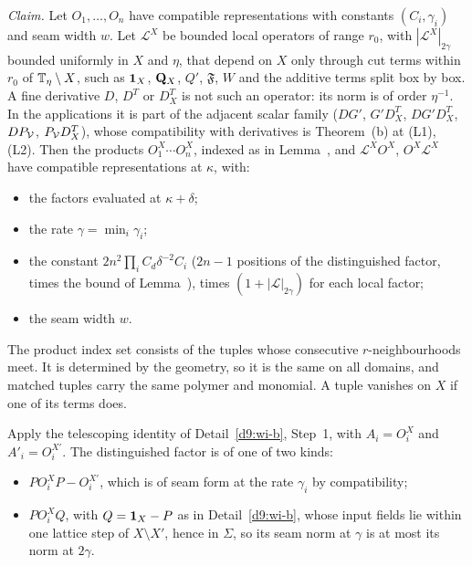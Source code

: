 \begin{detail}\label{d9:prod-compat}
\emph{Claim.} Let $O_1,\dots,O_n$ have compatible representations with constants $(C_i,\gamma_i)$ and seam width $w$. Let $\mathcal L^X$ be bounded local operators of range $r_0$, with $|\mathcal L^X|_{2\gamma}$ bounded uniformly in $X$ and $\eta$, that depend on $X$ only through cut terms within $r_0$ of $\mathbb T_\eta\setminus X$, such as $\mathbf 1_X$, $\mathbf Q_X$, $Q'$, $\mathfrak F$, $W$ and the additive terms split box by box. A fine derivative $D$, $D^T$ or $D^T_X$ is not such an operator: its norm is of order $\eta^{-1}$. In the applications it is part of the adjacent scalar family ($DG'$, $G'D^T_X$, $DG'D^T_X$, $DP_\mathcal V$, $P_\mathcal V D^T_X$), whose compatibility with derivatives is Theorem~(b) at (L1), (L2). Then the products $O_1^X\cdots O_n^X$, indexed as in Lemma~, and $\mathcal L^XO^X$, $O^X\mathcal L^X$ have compatible representations at $\kappa$, with:
\begin{itemize}
\item the factors evaluated at $\kappa+\delta$;
\item the rate $\gamma=\min_i\gamma_i$;
\item the constant $2n^2\prod_iC_d\delta^{-2}C_i$ ($2n-1$ positions of the distinguished factor, times the bound of Lemma~), times $(1+|\mathcal L|_{2\gamma})$ for each local factor;
\item the seam width $w$.
\end{itemize}
\begin{step}
The product index set consists of the tuples whose consecutive $r$-neighbourhoods meet. It is determined by the geometry, so it is the same on all domains, and matched tuples carry the same polymer and monomial. A tuple vanishes on $X$ if one of its terms does.
\end{step}
\begin{step}[Differences]
Apply the telescoping identity of Detail~\ref{d9:wi-b}, Step~1, with $A_i=O_i^X$ and $A'_i=O_i^{X'}$. The distinguished factor is of one of two kinds:
\begin{itemize}
\item $PO^X_iP-O^{X'}_i$, which is of seam form at the rate $\gamma_i$ by compatibility;
\item $PO_i^XQ$, with $Q=\mathbf 1_X-P$ as in Detail~\ref{d9:wi-b}, whose input fields lie within one lattice step of $X\setminus X'$, hence in $\Sigma$, so its seam norm at $\gamma$ is at most its norm at $2\gamma$.

\end{itemize}
\end{step}
\end{detail}
